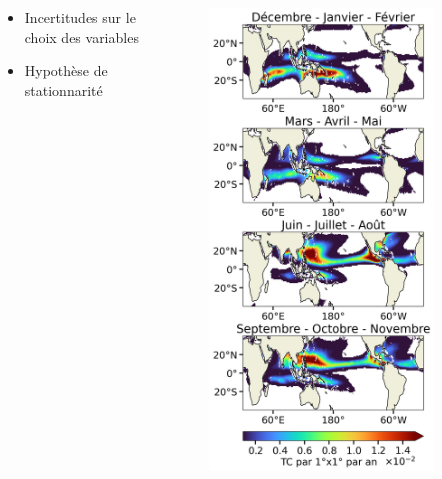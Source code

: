 \documentclass[aspectratio=169, usepdftitle=false, xcolor={dvipsnames}, 9pt,table]{beamer}
\begin{document}
\begin{frame}[t]
\begin{columns}[t]
\begin{column}{0.66\textwidth}
\begin{columns}[t]
\begin{column}{0.45\textwidth}
{\begin{alertblock}[Inconvénients]
\begin{itemize}
                                \item Incertitudes sur le choix des variables
                                \item Hypothèse de stationnarité 
                            \end{itemize}
                        \end{alertblock}
                    }
                \end{column}
            \end{columns}
        \end{column}
        \begin{column}{0.33\textwidth}
            \vspace{-6.5em}
            \begin{figure}
                \centering
                \includegraphics[width=0.88\textwidth]{Figures/acgi_seasonal_turbo.png}

\end{figure}
\end{column}
\end{columns}
\end{frame}
\end{document}
